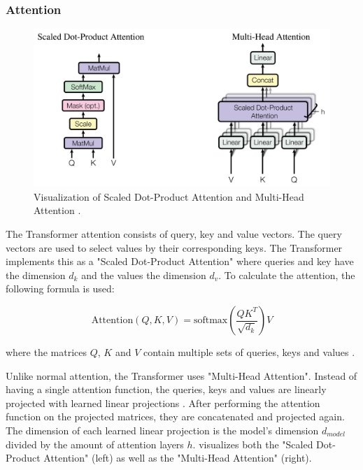 \subsubsection{Attention}

\begin{figure}[h]
\centering
\includegraphics[width=0.7\paperwidth]{figures/scaled-dot-product-multihead-attention}
\caption[Visualization of Scaled Dot-Product Attention and Multi-Head Attention]{Visualization of Scaled Dot-Product Attention and Multi-Head Attention \cite[p.~4]{1706.03762}.}
\label{fig:scaled-dot-product-multihead-attention}
\end{figure}

The Transformer attention consists of query, key and value vectors.
The query vectors are used to select values by their corresponding keys.
The Transformer implements this as a "Scaled Dot-Product Attention" where queries and key have the dimension $d_k$ and the values the dimension $d_v$.
To calculate the attention, the following formula is used:


\[
	\textrm{Attention}(Q,K,V) = \textrm{softmax}(\dfrac{QK^T}{\sqrt{d_k}})V
\]

where the matrices $Q$, $K$ and $V$ contain multiple sets of queries, keys and values \cite[p.~3--4]{1706.03762}.

Unlike normal attention, the Transformer uses "Multi-Head Attention".
Instead of having a single attention function, the queries, keys and values are linearly projected with learned linear projections \cite[p.~4--5]{1706.03762}.
After performing the attention function on the projected matrices, they are concatenated and projected again.
The dimension of each learned linear projection is the model's dimension $d_{model}$ divided by the amount of attention layers $h$.
 visualizes both the "Scaled Dot-Product Attention" (left) as well as the "Multi-Head Attention" (right).

